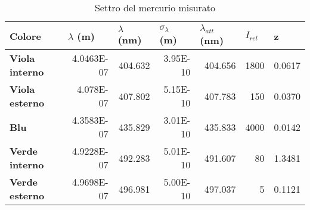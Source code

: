 \documentclass[a4paper,10pt]{article}
\begin{document}
\begin{table}[htbp]
  \centering
  \caption{Settro del mercurio misurato}
  	\medskip
    \begin{tabular}{lrrrrrr}
    \bottomrule
    \rowcolor[rgb]{ .267,  .447,  .769} \textcolor[rgb]{ 1,  1,  1}{\textbf{Colore}} & \multicolumn{1}{l}{\textcolor[rgb]{ 1,  1,  1}{\textbf{$\lambda$ (m)}}} & \multicolumn{1}{l}{\textcolor[rgb]{ 1,  1,  1}{\textbf{$\lambda$ (nm)}}} & \multicolumn{1}{l}{\textcolor[rgb]{ 1,  1,  1}{\textbf{$\sigma _\lambda$ (m)}}} & \multicolumn{1}{l}{\textcolor[rgb]{ 1,  1,  1}{\textbf{$\lambda _{att}$ (nm)}}} & \multicolumn{1}{l}{\textcolor[rgb]{ 1,  1,  1}{\textbf{$I _{rel}$}}} & \multicolumn{1}{l}{\textcolor[rgb]{ 1,  1,  1}{\textbf{z}}} \\
    \toprule
   \rowcolor[rgb]{ .267,  .447,  .769} \textcolor[rgb]{ 1,  1,  1}{\textbf{Viola interno}} & \cellcolor[rgb]{ .851,  .851,  .851} 4.0463E-07 & \cellcolor[rgb]{ .851,  .851,  .851} 404.632 & \cellcolor[rgb]{ .851,  .851,  .851} 3.95E-10 & \cellcolor[rgb]{ .851,  .851,  .851} 404.656 & \cellcolor[rgb]{ .851,  .851,  .851} 1800 & \cellcolor[rgb]{ .851,  .851,  .851} 0.0617 \\
    \rowcolor[rgb]{ .267,  .447,  .769} \textcolor[rgb]{ 1,  1,  1}{\textbf{Viola esterno}} & \cellcolor[rgb]{ 1,  1,  1} 4.078E-07 & \cellcolor[rgb]{ 1,  1,  1} 407.802 & \cellcolor[rgb]{ 1,  1,  1} 5.15E-10 & \cellcolor[rgb]{ 1,  1,  1} 407.783 & \cellcolor[rgb]{ 1,  1,  1} 150 & \cellcolor[rgb]{ 1,  1,  1} 0.0370 \\
    \rowcolor[rgb]{ .267,  .447,  .769} \textcolor[rgb]{ 1,  1,  1}{\textbf{Blu}} & \cellcolor[rgb]{ .851,  .851,  .851} 4.3583E-07 & \cellcolor[rgb]{ .851,  .851,  .851} 435.829 & \cellcolor[rgb]{ .851,  .851,  .851} 3.01E-10 & \cellcolor[rgb]{ .851,  .851,  .851} 435.833 & \cellcolor[rgb]{ .851,  .851,  .851} 4000 & \cellcolor[rgb]{ .851,  .851,  .851} 0.0142 \\
    \rowcolor[rgb]{ .267,  .447,  .769} \textcolor[rgb]{ 1,  1,  1}{\textbf{Verde interno}} & \cellcolor[rgb]{ 1,  1,  1} 4.9228E-07 & \cellcolor[rgb]{ 1,  1,  1} 492.283 & \cellcolor[rgb]{ 1,  1,  1} 5.01E-10 & \cellcolor[rgb]{ 1,  1,  1} 491.607 & \cellcolor[rgb]{ 1,  1,  1} 80 & \cellcolor[rgb]{ 1,  1,  1} 1.3481 \\
    \rowcolor[rgb]{ .267,  .447,  .769} \textcolor[rgb]{ 1,  1,  1}{\textbf{Verde esterno}} & \cellcolor[rgb]{ .851,  .851,  .851} 4.9698E-07 & \cellcolor[rgb]{ .851,  .851,  .851} 496.981 & \cellcolor[rgb]{ .851,  .851,  .851} 5.00E-10 & \cellcolor[rgb]{ .851,  .851,  .851} 497.037 & \cellcolor[rgb]{ .851,  .851,  .851} 5 & \cellcolor[rgb]{ .851,  .851,  .851} 0.1121 \\

\end{tabular}
\end{table}
\end{document}

